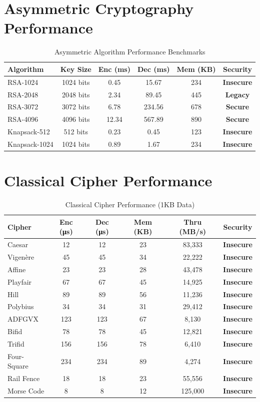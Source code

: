 \documentclass[12pt,a4paper]{article}
\newcommand{\performance}[1]{\textcolor{success}{\textbf{#1}}}
\newcommand{\warning}[1]{\textcolor{warning}{\textbf{#1}}}
\newcommand{\error}[1]{\textcolor{error}{\textbf{#1}}}
\newcommand{\smalltable}[1]{\small #1}
\begin{document}
\section{Asymmetric Cryptography Performance}

\begin{table}[h]
\centering
\smalltable{
\caption{Asymmetric Algorithm Performance Benchmarks}
\begin{tabular}{|l|c|c|c|c|c|}
\hline
\textbf{Algorithm} & \textbf{Key Size} & \textbf{Enc (ms)} & \textbf{Dec (ms)} & \textbf{Mem (KB)} & \textbf{Security} \\
\hline
RSA-1024 & 1024 bits & 0.45 & 15.67 & 234 & \error{Insecure} \\
RSA-2048 & 2048 bits & 2.34 & 89.45 & 445 & \warning{Legacy} \\
RSA-3072 & 3072 bits & 6.78 & 234.56 & 678 & \performance{Secure} \\
RSA-4096 & 4096 bits & 12.34 & 567.89 & 890 & \performance{Secure} \\
Knapsack-512 & 512 bits & 0.23 & 0.45 & 123 & \error{Insecure} \\
Knapsack-1024 & 1024 bits & 0.89 & 1.67 & 234 & \error{Insecure} \\
\hline
\end{tabular}
}
\end{table}

\section{Classical Cipher Performance}

\begin{table}[h]
\centering
\smalltable{
\caption{Classical Cipher Performance (1KB Data)}
\begin{tabular}{|l|c|c|c|c|c|}
\hline
\textbf{Cipher} & \textbf{Enc (μs)} & \textbf{Dec (μs)} & \textbf{Mem (KB)} & \textbf{Thru (MB/s)} & \textbf{Security} \\
\hline
Caesar & 12 & 12 & 23 & 83,333 & \error{Insecure} \\
Vigenère & 45 & 45 & 34 & 22,222 & \error{Insecure} \\
Affine & 23 & 23 & 28 & 43,478 & \error{Insecure} \\
Playfair & 67 & 67 & 45 & 14,925 & \error{Insecure} \\
Hill & 89 & 89 & 56 & 11,236 & \error{Insecure} \\
Polybius & 34 & 34 & 31 & 29,412 & \error{Insecure} \\
ADFGVX & 123 & 123 & 67 & 8,130 & \error{Insecure} \\
Bifid & 78 & 78 & 45 & 12,821 & \error{Insecure} \\
Trifid & 156 & 156 & 78 & 6,410 & \error{Insecure} \\
Four-Square & 234 & 234 & 89 & 4,274 & \error{Insecure} \\
Rail Fence & 18 & 18 & 23 & 55,556 & \error{Insecure} \\
Morse Code & 8 & 8 & 12 & 125,000 & \error{Insecure} \\
\hline
\end{tabular}
}
\end{table}
\end{document}
